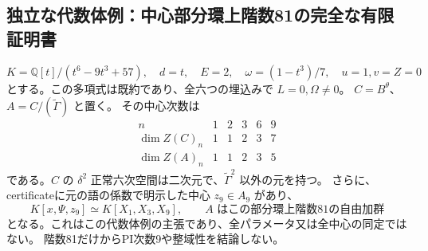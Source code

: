\subsection{独立な代数体例：中心部分環上階数81の完全な有限証明書}
\label{subsec:cubic-third-root-unit-boundary-L-finite-center}
\begin{proposition}[固定代数体例の中心次数と自由加群]
\label{prop:cubic-third-root-unit-boundary-L-finite-center}
\[
 K=\mathbb Q[t]/(t^6-9t^3+57),\quad
 d=t,\quad E=2,\quad\omega=(1-t^3)/7,\quad u=1,v=Z=0
\]
とする。この多項式は既約であり、全六つの埋込みで $L=0,\Omega\ne0$。
$C=B^\theta$、$A=C/(\widetilde\Gamma)$ と置く。
その中心次数は
\[
\begin{array}{c|ccccc}
 n&1&2&3&6&9\\\hline
 \dim Z(C)_n&1&1&2&3&7\\
 \dim Z(A)_n&1&1&2&3&5
\end{array}
\]
である。$C$ の $\delta^2$ 正常六次空間は二次元で、$\widetilde\Gamma^2$ 以外の元を持つ。
さらに、certificateに元の語の係数で明示した中心 $z_9\in A_9$ があり、
\[
 K[x,\Psi,z_9]\simeq K[X_1,X_3,X_9],\qquad
 A\text{ はこの部分環上階数81の自由加群}
\]
となる。これはこの代数体例の主張であり、全パラメータ又は全中心の同定ではない。
階数81だけからPI次数9や整域性を結論しない。
\end{proposition}

